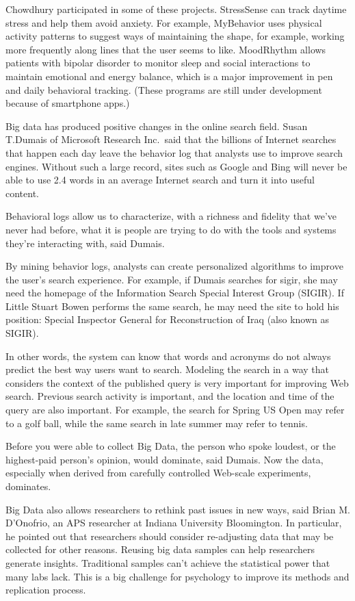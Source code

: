 Chowdhury participated in some of these projects. StressSense can track 
daytime stress and help them avoid anxiety. For example, MyBehavior uses 
physical activity patterns to suggest ways of maintaining the shape, for 
example, working more frequently along lines that the user seems to like. 
MoodRhythm allows patients with bipolar disorder to monitor sleep and social 
interactions to maintain emotional and energy balance, which is a major 
improvement in pen and daily behavioral tracking. (These programs are 
still under development because of smartphone apps.)

Big data has produced positive changes in the online search field. 
Susan T.Dumais of Microsoft Research Inc.\ said that the billions of Internet 
searches that happen each day leave the behavior log that analysts use 
to improve search engines. Without such a large record, sites such as 
Google and Bing will never be able to use 2.4 words in an average Internet 
search and turn it into useful content.

Behavioral logs allow us to characterize, with a richness and fidelity 
that we’ve never had before, what it is people are trying to do with
the tools and systems they’re interacting with, said Dumais\cite{editor01}.

By mining behavior logs, analysts can create personalized algorithms 
to improve the user's search experience. For example, if Dumais searches 
for sigir, she may need the homepage of the Information Search Special 
Interest Group (SIGIR). If Little Stuart Bowen performs the same search, 
he may need the site to hold his position: Special Inspector General 
for Reconstruction of Iraq (also known as SIGIR).

In other words, the system can know that words and acronyms do not always 
predict the best way users want to search. Modeling the search in a way 
that considers the context of the published query is very important for 
improving Web search. Previous search activity is important, and the 
location and time of the query are also important. For example, the 
search for Spring US Open may refer to a golf ball, while the same 
search in late summer may refer to tennis.

Before you were able to collect Big Data, the person who spoke loudest, 
or the highest-paid person’s opinion, would dominate, said Dumais. Now 
the data, especially when derived from carefully controlled Web-scale 
experiments, dominates.\cite{editor01}

Big Data also allows researchers to rethink past issues in new ways, 
said Brian M. D'Onofrio, an APS researcher at Indiana University Bloomington. 
In particular, he pointed out that researchers should consider re-adjusting 
data that may be collected for other reasons. Reusing big data samples can 
help researchers generate insights. Traditional samples can't achieve the 
statistical power that many labs lack. This is a big challenge for psychology 
to improve its methods and replication process.

